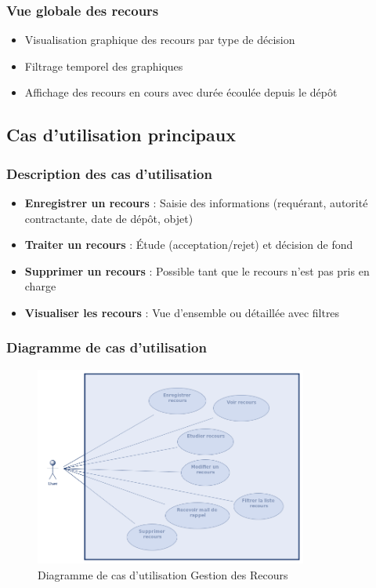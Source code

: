 \subsubsection{Vue globale des recours}
\begin{itemize}
    \item Visualisation graphique des recours par type de décision
    \item Filtrage temporel des graphiques
    \item Affichage des recours en cours avec durée écoulée depuis le dépôt
\end{itemize}

\subsection{Cas d'utilisation principaux}
\subsubsection{Description des cas d'utilisation}
\begin{itemize}
    \item \textbf{Enregistrer un recours} : Saisie des informations (requérant, autorité contractante, date de dépôt, objet)
    \item \textbf{Traiter un recours} : Étude (acceptation/rejet) et décision de fond
    \item \textbf{Supprimer un recours} : Possible tant que le recours n'est pas pris en charge
    \item \textbf{Visualiser les recours} : Vue d'ensemble ou détaillée avec filtres
\end{itemize}

\subsubsection{Diagramme de cas d'utilisation}
\begin{figure}[H]
    \centering
    \includegraphics[width=0.8\textwidth]{images/diagrammes/use-cases/Diagramme de cas d'utilisation recours.png}
    \caption{Diagramme de cas d'utilisation Gestion des Recours}
    \label{fig:use_case_gestion_recours}
\end{figure}
